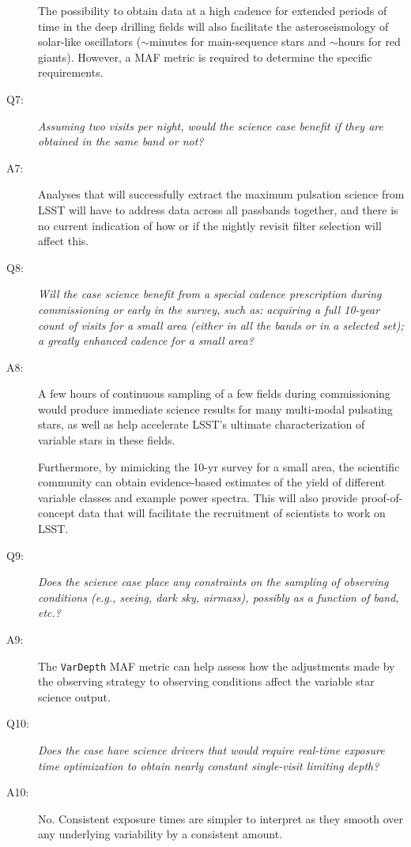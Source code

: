 \begin{description}
 The possibility to obtain data at a high cadence for extended periods of time in the deep drilling fields will also facilitate the asteroseismology of solar-like oscillators ($\sim$minutes for main-sequence stars and $\sim$hours for red giants). However, a MAF metric is required to determine the specific requirements.

 \item[Q7:] {\it Assuming two visits per night, would the science case
 benefit if they are obtained in the same band or not?}

 \item[A7:] Analyses that will successfully extract the maximum pulsation
 science from LSST will have to address data across all passbands together,
 and there is no current indication of how or if the nightly revisit filter selection
 will affect this.

 \item[Q8:] {\it Will the case science benefit from a special cadence
 prescription during commissioning or early in the survey, such as:
 acquiring a full 10-year count of visits for a small area (either in all
 the bands or in a  selected set); a greatly enhanced cadence for a small
 area?}

 \item[A8:] A few hours of continuous sampling of a few fields during
 commissioning would produce immediate science results for many
 multi-modal pulsating stars, as well as help accelerate LSST's ultimate
 characterization of variable stars in these fields.

 Furthermore, by mimicking the 10-yr survey for a small area, the scientific community can obtain evidence-based estimates of the yield of different variable classes and example power spectra. This will also provide proof-of-concept data that will facilitate the recruitment of scientists to work on LSST.


 \item[Q9:] {\it Does the science case place any constraints on the
 sampling of observing conditions (e.g., seeing, dark sky, airmass),
 possibly as a function of band, etc.?}

 \item[A9:] The {\tt VarDepth} MAF metric can help assess how the
 adjustments made by the observing strategy to observing conditions
 affect the variable star science output.


 \item[Q10:] {\it Does the case have science drivers that would require
 real-time exposure time optimization to obtain nearly constant
 single-visit limiting depth?}

 \item[A10:] No. Consistent exposure times are simpler to interpret as they
 smooth over any underlying variability by a consistent amount.

 \end{description}


\navigationbar

